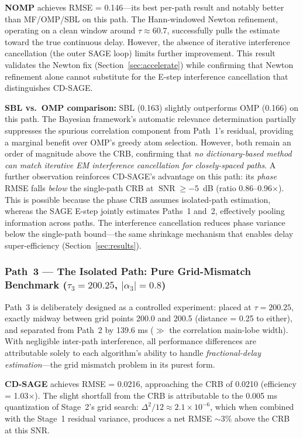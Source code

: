 \documentclass[a4paper,fleqn]{cas-dc}
\DeclareMathOperator{\SNR}{SNR}
\begin{document}
\textbf{NOMP} achieves RMSE = 0.146---its best per-path result and notably better than MF/OMP/SBL on this path. The Hann-windowed Newton refinement, operating on a clean window around $\tau \approx 60.7$, successfully pulls the estimate toward the true continuous delay. However, the absence of iterative interference cancellation (the outer SAGE loop) limits further improvement. This result validates the Newton fix (Section~\ref{sec:accelerate}) while confirming that Newton refinement alone cannot substitute for the E-step interference cancellation that distinguishes CD-SAGE.

\textbf{SBL vs.\ OMP comparison:} SBL (0.163) slightly outperforms OMP (0.166) on this path. The Bayesian framework's automatic relevance determination partially suppresses the spurious correlation component from Path~1's residual, providing a marginal benefit over OMP's greedy atom selection. However, both remain an order of magnitude above the CRB, confirming that \textit{no dictionary-based method can match iterative EM interference cancellation for closely-spaced paths}. A further observation reinforces CD-SAGE's advantage on this path: its \textit{phase} RMSE falls \textit{below} the single-path CRB at $\SNR \ge -5$~dB (ratio 0.86--0.96$\times$). This is possible because the phase CRB assumes isolated-path estimation, whereas the SAGE E-step jointly estimates Paths~1 and~2, effectively pooling information across paths. The interference cancellation reduces phase variance below the single-path bound---the same shrinkage mechanism that enables delay super-efficiency (Section~\ref{sec:results}).

\subsubsection{Path~3 --- The Isolated Path: Pure Grid-Mismatch Benchmark ($\tau_3 = 200.25$, $|\alpha_3| = 0.8$)}

Path~3 is deliberately designed as a controlled experiment: placed at $\tau = 200.25$, exactly midway between grid points 200.0 and 200.5 (distance = 0.25 to either), and separated from Path~2 by 139.6 ms ($\gg$ the correlation main-lobe width). With negligible inter-path interference, all performance differences are attributable solely to each algorithm's ability to handle \textit{fractional-delay estimation}---the grid mismatch problem in its purest form.

\textbf{CD-SAGE} achieves RMSE = 0.0216, approaching the CRB of 0.0210 (efficiency = 1.03$\times$). The slight shortfall from the CRB is attributable to the 0.005 ms quantization of Stage~2's grid search: $\Delta^2/12 \approx 2.1\times 10^{-6}$, which when combined with the Stage~1 residual variance, produces a net RMSE $\sim 3\%$ above the CRB at this SNR.
\end{document}
